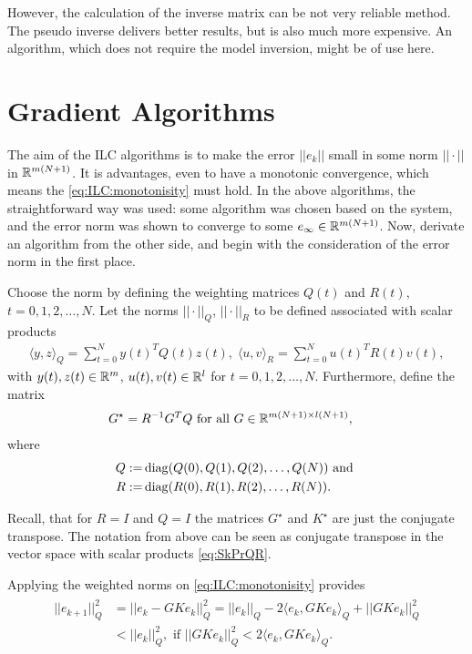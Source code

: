 However, the calculation of the  inverse matrix can be not very reliable method. The pseudo inverse delivers better results, but is also much more expensive. 
An algorithm, which does not require the model inversion, might be of use here. 
			
\section{Gradient Algorithms}
The aim of the ILC algorithms is to make the error $||e_k||$ small in some norm $||\cdot||$ in ${\mathbb{R}}^{m(N+1)}$. It is advantages, even to have a monotonic convergence, which means the \eqref{eq:ILC:monotonisity} must hold. In the above algorithms, the straightforward way was used: some algorithm was chosen based on the system, and the error norm was shown to converge to some $e_\infty \in {\mathbb{R}}^{m(N+1)}$. Now, derivate an algorithm from the other side, and begin with the consideration of the error norm in the first place. 


Choose the norm by defining the weighting matrices  $Q(t)$ and $R(t)$, $t = 0, 1, 2, \dots ,N$. Let the norms $||\cdot||_Q$, $||\cdot||_R$ to be defined associated with scalar products 
\begin{align}
\label{eq:SkPrQR}
\langle y,z\rangle_Q = \sum_{t = 0}^N y(t)^TQ(t)z(t), \; \langle u,v\rangle_R = \sum_{t = 0}^N u(t)^T R(t) v(t),
\end{align}
with $y(t), z(t) \in {\mathbb{R}}^{m}$, $u(t), v(t) \in {\mathbb{R}}^l$ for $t = 0,1,2, \dots, N$.
Furthermore, define the matrix 
\begin{align}
G^\star &= R^{-1} G^T Q \text{ for all } G \in {\mathbb{R}}^{m(N+1)\times l(N+1)},
\end{align}
where 
\begin{align}
	\begin{split}
	Q :=& \operatorname*{diag}(Q(0), Q(1), Q(2) ,\dots, Q(N)) \text{ and } \\
	R:=& \operatorname*{diag}(R(0), R(1), R(2), \dots, R(N)).
	\end{split}
\end{align}



Recall, that for $R = I$ and $Q = I$ the matrices $G^\star$ and $K^\star$ are just the conjugate transpose. The notation from above can be seen as conjugate transpose in the vector space with scalar products \eqref{eq:SkPrQR}.

Applying the weighted norms on \eqref{eq:ILC:monotonisity} provides
\begin{align}
\begin{split}
||e_{k+1} ||_Q^2 &= ||e_k - G K e_k||_Q^2 = ||e_k||_Q - 2\langle e_k , G K e_k \rangle_Q + ||G K e_k||_Q^2 \\ 
&< ||e_k||_Q^2, \text{ if } ||GK e_k||_Q^2 < 2 \langle e_k, GK e_k\rangle_Q. 
\end{split}
\end{align}

